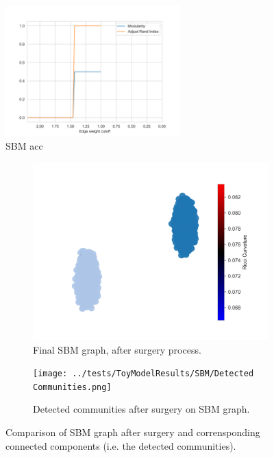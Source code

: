 \begin{figure}
    \centering
    \includegraphics[width=0.6\textwidth]{../tests/ToyModelResults/SBM/Surgery Accuracy.png}
    \caption{SBM acc}
\end{figure}
\label{fig:SBM_Accuracy}

\begin{figure}
    \centering
    \begin{subfigure}{0.45\textwidth}
        \centering
        \includegraphics[width=\textwidth]{../tests/ToyModelResults/SBM/After Surgery.png}
        \caption{Final SBM graph, after surgery process.}
    \end{subfigure}
    \hfill
    \begin{subfigure}{0.45\textwidth}
        \centering
        \texttt{[image: ../tests/ToyModelResults/SBM/Detected Communities.png]}
        \caption{Detected communities after surgery on SBM graph.}
    \end{subfigure}
    \caption{Comparison of SBM graph after surgery and corrensponding connected components (i.e. the detected communities).}
\end{figure}
\label{fig:SBM_Communities}


